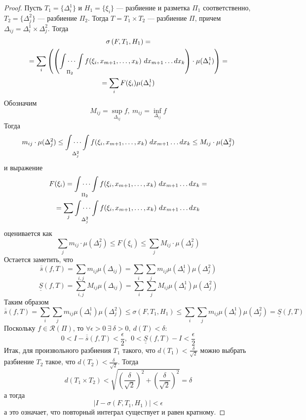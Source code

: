 \begin{proof}
    Пусть $T_1=\{\Delta_i^1\}$ и $H_1=\{\xi_i\}$ --- разбиение и разметка $\Pi_1$ соответственно, $T_2=\{\Delta_j^2\}$ --- разбиение $\Pi_2$. Тогда $T=T_1\times T_2$ --- разбиение $\Pi$, причем $\Delta_{ij}=\Delta_i^1\times \Delta_j^2$. Тогда 
    \begin{multline*}
        \sigma\left(F , T_1, H_1\right)=\\
        =\sum\limits_{i}\left( \left(\idotsint\limits_{\Pi_2} f(\xi_i, x_{m+1}, \dots, x_k)\ dx_{m+1}\dots dx_{k}\right)\cdot \mu(\Delta_i^1)\right)=\\
        =\sum\limits_{i} F(\xi_i) \mu(\Delta_i^1)
    \end{multline*}
    Обозначим
    \[M_{ij}=\sup\limits_{\Delta_{ij}} f,\ m_{ij}=\inf\limits_{\Delta_{ij}} f\]
    Тогда
    \[m_{ij}\cdot \mu(\Delta_j^2)\leq\idotsint\limits_{\Delta_j^2} f(\xi_i, x_{m+1},\dots,x_k)\ dx_{m+1}\dots dx_k\leq M_{ij}\cdot \mu(\Delta_j^2)\]
    и выражение
    \begin{multline*}
        F(\xi_i)=\idotsint\limits_{\Pi_2} f(\xi_i, x_{m+1}, \dots, x_k)\ dx_{m+1}\dots dx_k=\\
        =\sum\limits_{j} \idotsint\limits_{\Delta_j^2} f(\xi_i, x_{m+1},\dots,x_k)\ dx_{m+1}\dots dx_k
    \end{multline*}
    оценивается как
    \[\sum\limits_j m_{ij}\cdot \mu(\Delta_j^2)\leq F(\xi_i)\leq\sum\limits_j M_{ij}\cdot \mu(\Delta_j^2)\]
    Остается заметить, что
    \[\overline{\overline{s}}(f,T)=\sum\limits_{i,j}m_{ij}\mu(\Delta_{ij})=\sum\limits_{i}\sum\limits_{j}m_{ij} \mu(\Delta_i^1) \mu(\Delta_j^2)\]
    \[\underline{\underline{S}}(f,T)=\sum\limits_{i,j}M_{ij}\mu(\Delta_{ij})=\sum\limits_{i}\sum\limits_{j}M_{ij} \mu(\Delta_i^1) \mu(\Delta_j^2)\]
    Таким образом
    \[\overline{\overline{s}}(f, T)=\sum\limits_{i}\sum\limits_{j}m_{ij} \mu(\Delta_i^1) \mu(\Delta_j^2)\leq \sigma(F,T_1,H_1) \leq \sum\limits_{i}\sum\limits_{j}m_{ij}\mu(\Delta_i^1) \mu(\Delta_j^2)=\underline{\underline{S}}(f,T)\]
    Поскольку $f\in \mathcal{R}(\Pi)$, то $\forall \epsilon>0\ \exists\ \delta>0,\ d(T)<\delta$:
    \[0<I-\overline{\overline{s}}(f,T)<\frac{\epsilon}{2},\ \ 0<\underline{\underline{S}}(f,T)-I<\frac{\epsilon}{2}\]
    Итак, для произвольного разбиения $T_1$ такого, что $d(T_1)<\frac{\delta}{\sqrt{2}}$ можно выбрать разбиение $T_2$ такое, что $d(T_2)<\frac{\delta}{\sqrt{2}}$. Тогда 
    \[d(T_1\times T_2)<\sqrt{\left(\frac{\delta}{\sqrt{2}}\right)^2+\left(\frac{\delta}{\sqrt{2}}\right)^2}=\delta\] 
    а тогда
    \[|I-\sigma(F,T_1,H_1)|<\epsilon\]
    а это означает, что повторный интеграл существует и равен кратному.
\end{proof}
